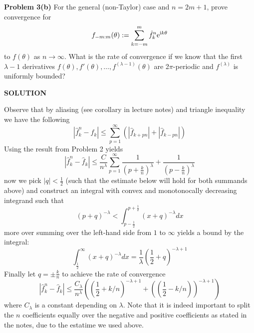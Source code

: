 \documentclass[12pt,a4paper]{article}
\begin{document}
\textbf{Problem 3(b)} For the general (non-Taylor) case and $n = 2m+1$, prove convergence for
\[
f_{-m:m}(\ensuremath{\theta}) := \ensuremath{\sum}_{k=-m}^m \hat f_k^n {\rm e}^{{\rm i} k \ensuremath{\theta}}
\]
to $f(\ensuremath{\theta})$ as $n \ensuremath{\rightarrow} \ensuremath{\infty}$. What is the rate of convergence if we know that the first $\ensuremath{\lambda}-1$ derivatives $f(\ensuremath{\theta}), f'(\ensuremath{\theta}), \ensuremath{\ldots}, f^{(\ensuremath{\lambda}-1)}(\ensuremath{\theta})$ are 2\ensuremath{\pi}-periodic and $f^{(\ensuremath{\lambda})}$ is uniformly bounded?

\textbf{SOLUTION}

Observe that by aliasing (see corollary in lecture notes) and triangle inequality we have the following
\[
|\hat f_k^n - \hat f_k|  \ensuremath{\leq} \ensuremath{\sum}_{p=1}^{\ensuremath{\infty}} (|\hat f_{k+pn}|+|\hat f_{k-pn}|)
\]
Using the result from Problem 2 yields
\[
|\hat f_k^n - \hat f_k| \ensuremath{\leq} \frac{C}{n^\ensuremath{\lambda}} \ensuremath{\sum}_{p=1}^{\ensuremath{\infty}} \frac{1}{\left(p + \frac{k}{n}\right)^\ensuremath{\lambda}} + \frac{1}{\left(p - \frac{k}{n}\right)^\ensuremath{\lambda}}
\]
now we pick $|q| < \frac{1}{2}$ (such that the estimate below will hold for both summands above) and construct an integral with convex and monotonocally decreasing integrand such that
\[
\left( p + q \right)^{-\ensuremath{\lambda}} < \int_{p-\frac{1}{2}}^{p+\frac{1}{2}} (x + q)^{-\ensuremath{\lambda}} dx
\]
more over summing over the left-hand side from $1$ to $\ensuremath{\infty}$ yields a bound by the integral:
\[
\int^{\ensuremath{\infty}}_{\frac{1}{2}} (x + q)^{-\ensuremath{\lambda}} dx = \frac{1}{\ensuremath{\lambda}}(\frac{1}{2} + q)^{- \ensuremath{\lambda} + 1}
\]
Finally let $q = \pm \frac{k}{n}$ to achieve the rate of convergence
\[
|\hat f_k^n - \hat f_k| \ensuremath{\leq} \frac{C_{\ensuremath{\lambda}}}{ n^{\ensuremath{\lambda}}} \left(  \left( \frac{1}{2} + k/n \right)^{ - \ensuremath{\lambda} + 1} + \left( \left( \frac{1}{2} - k/n \right) \right)^{- \ensuremath{\lambda} +1} \right)
\]
where $C_{\ensuremath{\lambda}}$ is a constant depending on $\ensuremath{\lambda}$. Note that it is indeed important to split the $n$ coefficients equally over the negative and positive coefficients as stated in the notes, due to the estatime we used above.
\end{document}
